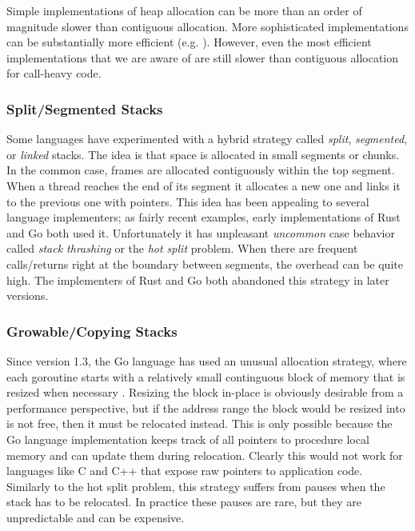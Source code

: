 \documentclass[acmsmall,anonymous,review]{acmart}\settopmatter{printfolios=true,printccs=false,printacmref=false}
\begin{document}
Simple implementations of heap allocation can be more than an order of magnitude slower than contiguous allocation.
More sophisticated implementations can be substantially more efficient (e.g. \cite{Shao2000}).
However, even the most efficient implementations that we are aware of are still slower than contiguous allocation for call-heavy code.

\subsubsection{Split/Segmented Stacks}

Some languages have experimented with a hybrid strategy called \emph{split}, \emph{segmented}, or \emph{linked} stacks.
The idea is that space is allocated in small segments or chunks.
In the common case, frames are allocated contiguously within the top segment.
When a thread reaches the end of its segment it allocates a new one and links it to the previous one with pointers.
This idea has been appealing to several language implementers; as fairly recent examples, early implementations of Rust and Go both used it.
Unfortunately it has unpleasant \emph{uncommon} case behavior called \emph{stack thrashing} or the \emph{hot split} problem.
When there are frequent calls/returns right at the boundary between segments, the overhead can be quite high.
The implementers of Rust \cite{Anderson2013} and Go \cite{Anastasopoulos2014} both abandoned this strategy in later versions.


\subsubsection{Growable/Copying Stacks}

Since version 1.3, the Go language has used an unusual allocation strategy, where each goroutine starts with a relatively small continguous block of memory that is resized when necessary \cite{Cheney2014, Morsing2014}.
Resizing the block in-place is obviously desirable from a performance perspective, but if the address range the block would be resized into is not free, then it must be relocated instead.
This is only possible because the Go language implementation keeps track of all pointers to procedure local memory and can update them during relocation.
Clearly this would not work for languages like C and C++ that expose raw pointers to application code.
Similarly to the hot split problem, this strategy suffers from pauses when the stack has to be relocated.
In practice these pauses are rare, but they are unpredictable and can be expensive.
\end{document}
